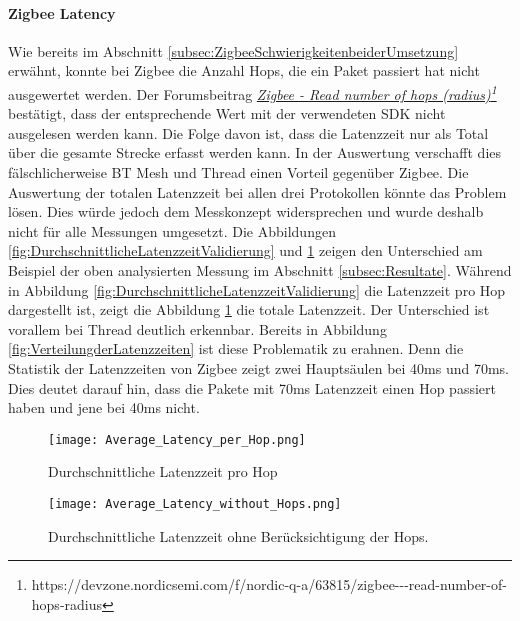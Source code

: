 \paragraph{Zigbee Latency}
Wie bereits im Abschnitt \ref{subsec:ZigbeeSchwierigkeitenbeiderUmsetzung} erwähnt, konnte bei Zigbee die Anzahl Hops, die ein Paket passiert hat nicht ausgewertet werden.
Der Forumsbeitrag \href{https://devzone.nordicsemi.com/f/nordic-q-a/63815/zigbee---read-number-of-hops-radius}{\textit{Zigbee - Read number of hops (radius)\footnote{\url{https://devzone.nordicsemi.com/f/nordic-q-a/63815/zigbee---read-number-of-hops-radius}}}} bestätigt, dass der entsprechende Wert mit der verwendeten SDK nicht ausgelesen werden kann.
Die Folge davon ist, dass die Latenzzeit nur als Total über die gesamte Strecke erfasst werden kann.
In der Auswertung verschafft dies fälschlicherweise BT Mesh und Thread einen Vorteil gegenüber Zigbee.
Die Auswertung der totalen Latenzzeit bei allen drei Protokollen könnte das Problem lösen.
Dies würde jedoch dem Messkonzept widersprechen und wurde deshalb nicht für alle Messungen umgesetzt.
Die Abbildungen \ref{fig:DurchschnittlicheLatenzzeitValidierung} und \ref{fig:DurchschnittlicheLatenzzeitohneHopsValidierung} zeigen den Unterschied am Beispiel der oben analysierten Messung im Abschnitt \ref{subsec:Resultate}.
Während in Abbildung \ref{fig:DurchschnittlicheLatenzzeitValidierung} die Latenzzeit pro Hop dargestellt ist, zeigt die Abbildung \ref{fig:DurchschnittlicheLatenzzeitohneHopsValidierung} die totale Latenzzeit.
Der Unterschied ist vorallem bei Thread deutlich erkennbar.
Bereits in Abbildung \ref{fig:VerteilungderLatenzzeiten} ist diese Problematik zu erahnen.
Denn die Statistik der Latenzzeiten von Zigbee zeigt zwei Hauptsäulen bei 40ms und 70ms. Dies deutet darauf hin, dass die Pakete mit 70ms Latenzzeit einen Hop passiert haben und jene bei 40ms nicht.


\begin{figure}[!htbp]
\centering
\begin{minipage}[b]{0.49\textwidth}
		\centering
		\texttt{[image: Average\_Latency\_per\_Hop.png]}
		\caption{Durchschnittliche Latenzzeit pro Hop}
		\label{fig:DurchschnittlicheLatenzzeitValidierung}
\end{minipage}
\begin{minipage}[b]{0.49\textwidth}
		\centering
		\texttt{[image: Average\_Latency\_without\_Hops.png]}
		\caption{Durchschnittliche Latenzzeit ohne Berücksichtigung der Hops.}	\label{fig:DurchschnittlicheLatenzzeitohneHopsValidierung}
\end{minipage}
\end{figure}

